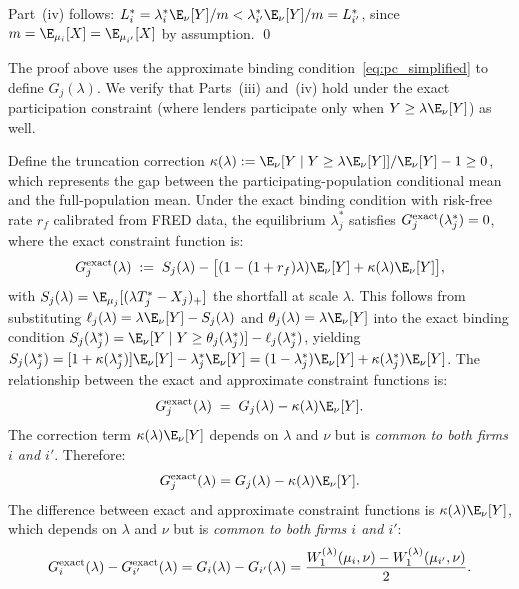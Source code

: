 Part~(iv) follows: $L_i^* = \lambda_i^*\E_\nu[Y]/m < \lambda_{i'}^*\E_\nu[Y]/m = L_{i'}^*$, since $m = \E_{\mu_i}[X] = \E_{\mu_{i'}}[X]$ by assumption. \qed

\begin{remark}
\label{rem:monotone_exact}
The proof above uses the approximate binding condition~\eqref{eq:pc_simplified} to define $G_j(\lambda)$. We verify that Parts~(iii) and~(iv) hold under the exact participation constraint (where lenders participate only when $Y \geq \lambda\E_\nu[Y]$) as well.

Define the truncation correction $\kappa(\lambda) := \E_\nu[Y \mid Y \geq \lambda\E_\nu[Y]]/\E_\nu[Y] - 1 \geq 0$, which represents the gap between the participating-population conditional mean and the full-population mean. Under the exact binding condition with risk-free rate $r_f$ calibrated from FRED data, the equilibrium $\lambda_j^*$ satisfies $G_j^{\rm exact}(\lambda_j^*) = 0$, where the exact constraint function is:
\[
  G_j^{\rm exact}(\lambda) \;:=\; S_j(\lambda) - \bigl[(1-(1+r_f)\lambda)\E_\nu[Y] + \kappa(\lambda)\E_\nu[Y]\bigr],
\]
with $S_j(\lambda) = \E_{\mu_j}[(\lambda T_j^* - X_j)_+]$ the shortfall at scale $\lambda$. This follows from substituting $\ell_j(\lambda) = \lambda\E_\nu[Y] - S_j(\lambda)$ and $\theta_j(\lambda) = \lambda\E_\nu[Y]$ into the exact binding condition $S_j(\lambda_j^*) = \E_\nu[Y \mid Y \geq \theta_j(\lambda_j^*)] - \ell_j(\lambda_j^*)$, yielding $S_j(\lambda_j^*) = [1 + \kappa(\lambda_j^*)]\E_\nu[Y] - \lambda_j^*\E_\nu[Y] = (1-\lambda_j^*)\E_\nu[Y] + \kappa(\lambda_j^*)\E_\nu[Y]$. The relationship between the exact and approximate constraint functions is:
\[
  G_j^{\rm exact}(\lambda) \;=\; G_j(\lambda) - \kappa(\lambda)\E_\nu[Y].
\]
The correction term $\kappa(\lambda)\E_\nu[Y]$ depends on $\lambda$ and $\nu$ but is \emph{common to both firms $i$ and $i'$}. Therefore:
\[
  G_j^{\rm exact}(\lambda) = G_j(\lambda) - \kappa(\lambda)\E_\nu[Y].
\]
The difference between exact and approximate constraint functions is $\kappa(\lambda)\E_\nu[Y]$, which depends on $\lambda$ and $\nu$ but is \emph{common to both firms $i$ and $i'$}:
\[
  G_i^{\rm exact}(\lambda) - G_{i'}^{\rm exact}(\lambda) = G_i(\lambda) - G_{i'}(\lambda) = \frac{W_1^{(\lambda)}(\mu_i,\nu) - W_1^{(\lambda)}(\mu_{i'},\nu)}{2}.
\]

\end{remark}
